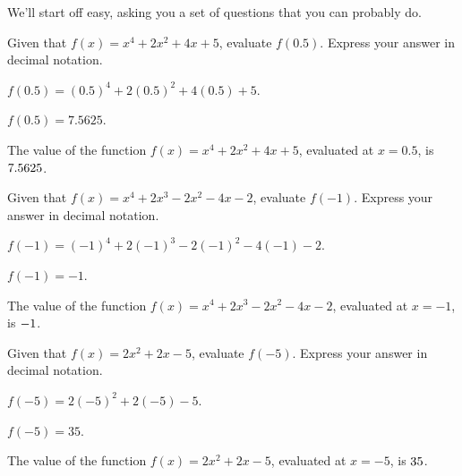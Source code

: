 
We'll start off easy, asking you a set of questions that you can
probably do.


\begin{shuffle}
\begin{exercise}
Given that $f(x)=x^4+2 x^2+4 x+5$, evaluate $f(0.5)$. Express your answer in decimal notation.
\begin{solution}
\begin{hint}
$f(0.5)=(0.5)^4+2 (0.5)^2+4 (0.5)+5$.
\end{hint}
\begin{hint}
$f(0.5)=7.5625$.
\end{hint}
The value of the function $f(x) = x^4+2 x^2+4 x+5$, evaluated at $x=0.5$, is ${7.5625}$.
\end{solution}
\end{exercise}

\begin{exercise}
Given that $f(x)=x^4+2 x^3-2 x^2-4 x-2$, evaluate $f(-1)$. Express your answer in decimal notation.
\begin{solution}
\begin{hint}
$f(-1)=(-1)^4+2 (-1)^3-2 (-1)^2-4 (-1)-2$.
\end{hint}
\begin{hint}
$f(-1)=-1$.
\end{hint}
The value of the function $f(x) = x^4+2 x^3-2 x^2-4 x-2$, evaluated at $x=-1$, is ${-1}$.
\end{solution}
\end{exercise}

\begin{exercise}
Given that $f(x)=2 x^2+2 x-5$, evaluate $f(-5)$. Express your answer in decimal notation.
\begin{solution}
\begin{hint}
$f(-5)=2 (-5)^2+2 (-5)-5$.
\end{hint}
\begin{hint}
$f(-5)=35$.
\end{hint}
The value of the function $f(x) = 2 x^2+2 x-5$, evaluated at $x=-5$, is ${35}$.
\end{solution}
\end{exercise}


\end{shuffle}
